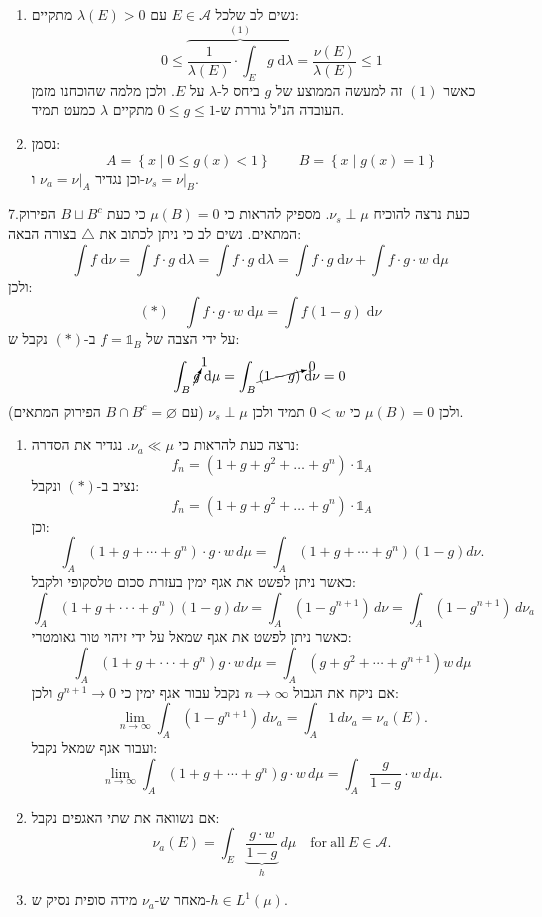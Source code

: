 \documentclass{tstextbook}
\begin{document}
\begin{theorem}
\begin{enumerate}
    \item נשים לב שלכל \(E\in \mathcal{A}\) עם \(\lambda(E)>0\) מתקיים: 
$$0\leq\overbrace{ \frac{1}{\lambda(E)}\cdot \int _{E}g \;\mathrm{d} \lambda }^{(1) } = \frac{\nu(E)}{\lambda(E)} \leq 1$$
כאשר \((1)\) זה למעשה הממוצע של \(g\) ביחס ל-\(\lambda\) על \(E\). ולכן מלמה שהוכחנו מזמן העובדה הנ"ל גוררת ש-\(0\leq g \leq 1\) מתקיים \(\lambda\) כמעט תמיד.


    \item נסמן: 
$$A=\left\{  x\mid 0\leq g(x)<1  \right\}\qquad B=\left\{  x\mid g(x)=1  \right\}$$
וכן נגדיר \(\nu_{a}=\nu|_{A}\) ו-\(\nu_{s}=\nu|_{B}\).


  \end{enumerate}
7.כעת נרצה להוכיח \(\nu_{s}\perp \mu\). מספיק להראות כי \(\mu(B)=0\) כי כעת \(B \sqcup B^{c}\) הפירוק המתאים. נשים לב כי ניתן לכתוב את \(\triangle\) בצורה הבאה: 
$$\int f \;\mathrm{d} \nu =\int f\cdot g \;\mathrm{d} \lambda = \int f\cdot g \;\mathrm{d} \lambda = \int f\cdot g \;\mathrm{d} \nu+\int f\cdot g\cdot w \;\mathrm{d} \mu    $$
ולכן:
$$(*)\quad \int f\cdot g\cdot w \;\mathrm{d} \mu = \int f(1-g) \;\mathrm{d} \nu  $$
על ידי הצבה של \(f=\mathbb{1}_{B}\) ב-\((*)\) נקבל ש:
$$\int_{B} \cancelto{ 1 }{ g } \;\mathrm{d} \mu = \int_{B} \cancelto{ 0 }{ (1-g) } \;\mathrm{d} \nu  =0$$
ולכן \(\mu(B)=0\) כי \(0<w\) תמיד ולכן \(\nu_{s}\perp \mu\) (עם \(B\cap B^{c}=\varnothing\) הפירוק המתאים).

  \begin{enumerate}
    \item נרצה כעת להראות כי \(\nu_{a}\ll \mu\). נגדיר את הסדרה: 
$$f_{n}=\left( 1+g+g^{2}+\dots+ g^{n} \right)\cdot \mathbb{1} _{A}$$
נציב ב-\((*)\) ונקבל:
$$f_{n}=\left( 1+g+g^{2}+\dots+ g^{n} \right)\cdot \mathbb{1} _{A}$$
וכן:
$$\int_{A}\left(1+g+\cdots+g^{n}\right)\cdot g\cdot w\,d\mu=\int_{A}\left(1+g+\cdots+g^{n}\right)\left(1-g\right)d\nu.$$
כאשר ניתן לפשט את אגף ימין בעזרת סכום טלסקופי ולקבל:
$$\int_{A}\left(1+g+\cdot\cdot\cdot+g^{n}\right)\left(1-g\right)d\nu=\int_{A}\left(1-g^{n+1}\right)\,d\nu=\int_{A}\left(1-g^{n+1}\right)\,d\nu_{a}$$
כאשר ניתן לפשט את אגף שמאל על ידי זיהוי טור גאומטרי:
$$\int_{A}\left(1+g+\cdot\cdot\cdot+g^{n}\right)g\cdot w\,d\mu=\int_{A}\left(g+g^{2}+\cdots+g^{n+1}\right)w\,d\mu$$
אם ניקח את הגבול \(n\to \infty\) נקבל עבור אגף ימין כי \(g^{n+1}\to 0\) ולכן:
$$\operatorname*{lim}_{n\to\infty}\int_{A}\left(1-g^{n+1}\right)\,d\nu_{a}=\int_{A}1\,d\nu_{a}=\nu_{a}(E).$$
ועבור אגף שמאל נקבל:
$$\operatorname*{lim}_{n\to\infty}\int_{A}\left(1+g+\cdots+g^{n}\right)g\cdot w\,d\mu=\int_{A}{\frac{g}{1-g}}\cdot w\,d\mu.$$


    \item אם נשוואה את שתי האגפים נקבל: 
$$\nu_{a}(E)=\int_{E}\underbrace{\frac{g\cdot w}{1-g}}_{h}\,d\mu\quad\mathrm{for~all~}E\in\mathcal{A}.$$


    \item מאחר ש-\(\nu_{a}\) מידה סופית נסיק ש-\(h \in L^{1}\left( \mu \right)\). 


  \end{enumerate}
\end{theorem}
\end{document}
